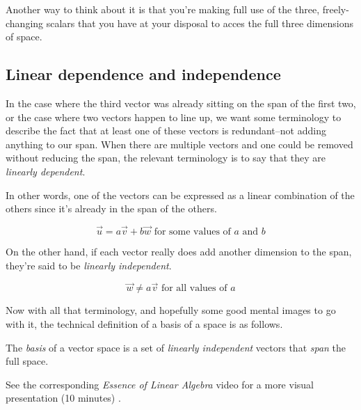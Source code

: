 Another way to think about it is that you're making full use of the three,
freely-changing scalars that you have at your disposal to acces the full three
dimensions of space.

\subsection{Linear dependence and independence}

In the case where the third vector was already sitting on the span of the first
two, or the case where two vectors happen to line up, we want some terminology
to describe the fact that at least one of these vectors is redundant--not adding
anything to our span. When there are multiple vectors and one could be removed
without reducing the span, the relevant terminology is to say that they are
\textit{linearly dependent}.

In other words, one of the vectors can be expressed as a linear combination of
the others since it's already in the span of the others.

\begin{equation*}
  \vec{u} = a\vec{v} + b\vec{w} \text{ for some values of $a$ and $b$}
\end{equation*}

On the other hand, if each vector really does add another dimension to the span,
they're said to be \textit{linearly independent}.

\begin{equation*}
  \vec{w} \neq a\vec{v} \text{ for all values of $a$}
\end{equation*}

Now with all that terminology, and hopefully some good mental images to go with
it, the technical definition of a basis of a space is as follows.

\begin{definition}
  The \textit{basis} of a vector space is a set of \textit{linearly independent}
  vectors that \textit{span} the full space.
\end{definition}

\begin{remark}
  See the corresponding \textit{Essence of Linear Algebra} video for a more
  visual presentation (10 minutes) \cite{bib:linalg_linear_combinations}.
\end{remark}
